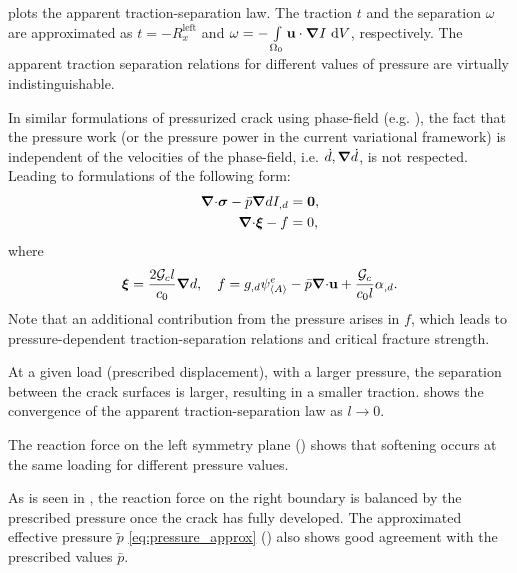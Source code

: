  plots the apparent traction-separation law. The traction $t$ and the separation $\omega$ are approximated as $t = -R_x^\text{left}$ and $\omega = - \int\limits_{\Omega_0} \textbf{u} \cdot \boldsymbol{\nabla} I \text{ d}V$, respectively. The apparent traction separation relations for different values of pressure are virtually indistinguishable.
\begin{remark}
  In similar formulations of pressurized crack using phase-field (e.g. \cite{CHUKWUDOZIE2019957,Mikeli__2015,WILSON2016264}), the fact that the pressure work (or the pressure power in the current variational framework) is independent of the velocities of the phase-field, i.e. $\dot{d}, \boldsymbol{\nabla} \dot{d}$, is not respected. Leading to formulations of the following form:
  \begin{subequations}
    \begin{align}
      {\boldsymbol{\nabla}\cdot} \boldsymbol{\sigma} - \bar{p} \boldsymbol{\nabla} d I_{,d} & = \boldsymbol{0}, \\
      {\boldsymbol{\nabla} \cdot} \boldsymbol{\xi} - f                     & = 0,      
    \end{align}
  \end{subequations}
  where
  \begin{align}
    \boldsymbol{\xi} = \dfrac{2{\mathcal{G}_c} l}{c_0} \boldsymbol{\nabla} d, \quad f = g_{,d}\psi^e_{\left< A \right>} - \bar{p}{\boldsymbol{\nabla} \cdot}\textbf{u} + \dfrac{{\mathcal{G}_c}}{c_0l}\alpha_{,d}.
  \end{align}
  Note that an additional contribution from the pressure arises in $f$, which leads to pressure-dependent traction-separation relations and critical fracture strength.
\end{remark}
At a given load (prescribed displacement), with a larger pressure, the separation between the crack surfaces is larger, resulting in a smaller traction.  shows the convergence of the apparent traction-separation law as $l \to 0$.



The reaction force on the left symmetry plane () shows that softening occurs at the same loading for different pressure values.

As is seen in , the reaction force on the right boundary is balanced by the prescribed pressure once the crack has fully developed.
The approximated effective pressure $\widetilde{p}$ \eqref{eq:pressure_approx} () also shows good agreement with the prescribed values $\bar{p}$.

